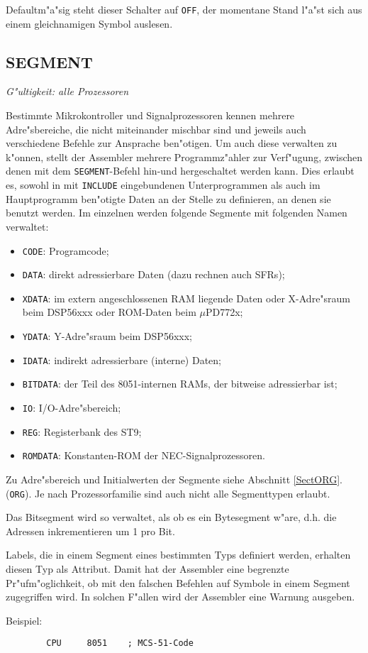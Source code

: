 \documentclass[12pt,a4paper,twoside]{report}
\makeatletter
\newcommand{\tty}[1]{{\tt #1}}
\newcommand{\ttindex}[1]{\index{#1@{\tt #1}}}
\makeatother
\begin{document}
{Defaultm"a"sig steht dieser Schalter auf {\tt OFF}, der momentane Stand
l"a"st sich aus einem gleichnamigen Symbol auslesen.


\subsection{SEGMENT}
\ttindex{SEGMENT}

{\em G"ultigkeit: alle Prozessoren}

Bestimmte Mikrokontroller und Signalprozessoren kennen mehrere
Adre"sbereiche, die nicht miteinander mischbar sind und jeweils auch
verschiedene Befehle zur Ansprache ben"otigen.  Um auch diese verwalten zu
k"onnen, stellt der Assembler mehrere Programmz"ahler zur Verf"ugung,
zwischen denen mit dem
\tty{SEGMENT}-Befehl hin-und hergeschaltet werden kann.  Dies erlaubt es,
sowohl in mit \tty{INCLUDE} eingebundenen Unterprogrammen als auch im
Hauptprogramm ben"otigte Daten an der Stelle zu definieren, an denen
sie benutzt werden.  Im einzelnen werden folgende Segmente mit folgenden
Namen verwaltet:
\begin{itemize}
\item{\tty{CODE}: Programcode;}
\item{\tty{DATA}: direkt adressierbare Daten (dazu rechnen auch SFRs);}
\item{\tty{XDATA}: im extern angeschlossenen RAM liegende Daten oder
             X-Adre"sraum beim DSP56xxx oder ROM-Daten beim $\mu$PD772x;}
\item{\tty{YDATA}: Y-Adre"sraum beim DSP56xxx;}
\item{\tty{IDATA}: indirekt adressierbare (interne) Daten;}
\item{\tty{BITDATA}: der Teil des 8051-internen RAMs, der bitweise
      adressierbar ist;}
\item{\tty{IO}: I/O-Adre"sbereich;}
\item{\tty{REG}: Registerbank des ST9;}
\item{\tty{ROMDATA}: Konstanten-ROM der NEC-Signalprozessoren.}
\end{itemize}
Zu Adre"sbereich und Initialwerten der Segmente siehe Abschnitt \ref{SectORG}.
(\tty{ORG}).  Je nach Prozessorfamilie sind auch nicht alle Segmenttypen
erlaubt.
\par
Das Bitsegment wird so verwaltet, als ob es ein Bytesegment w"are,
d.h. die Adressen inkrementieren um 1 pro Bit.
\par
Labels, die in einem Segment eines bestimmten Typs definiert werden,
erhalten diesen Typ als Attribut.  Damit hat der Assembler eine
begrenzte Pr"ufm"oglichkeit, ob mit den falschen Befehlen auf Symbole
in einem Segment zugegriffen wird.  In solchen F"allen wird der
Assembler eine Warnung ausgeben.
\par
Beispiel:
\begin{verbatim}
        CPU     8051    ; MCS-51-Code


\end{verbatim}}
\end{document}
